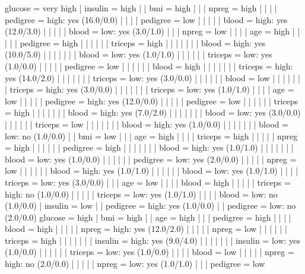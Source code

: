 glucose = very high
|   insulin = high
|   |   bmi = high
|   |   |   npreg = high
|   |   |   |   pedigree = high: yes (16.0/0.0)
|   |   |   |   pedigree = low
|   |   |   |   |   blood = high: yes (12.0/3.0)
|   |   |   |   |   blood = low: yes (3.0/1.0)
|   |   |   npreg = low
|   |   |   |   age = high
|   |   |   |   |   pedigree = high
|   |   |   |   |   |   triceps = high
|   |   |   |   |   |   |   blood = high: yes (10.0/5.0)
|   |   |   |   |   |   |   blood = low: yes (1.0/1.0)
|   |   |   |   |   |   triceps = low: yes (1.0/0.0)
|   |   |   |   |   pedigree = low
|   |   |   |   |   |   blood = high
|   |   |   |   |   |   |   triceps = high: yes (14.0/2.0)
|   |   |   |   |   |   |   triceps = low: yes (3.0/0.0)
|   |   |   |   |   |   blood = low
|   |   |   |   |   |   |   triceps = high: yes (3.0/0.0)
|   |   |   |   |   |   |   triceps = low: yes (1.0/1.0)
|   |   |   |   age = low
|   |   |   |   |   pedigree = high: yes (12.0/0.0)
|   |   |   |   |   pedigree = low
|   |   |   |   |   |   triceps = high
|   |   |   |   |   |   |   blood = high: yes (7.0/2.0)
|   |   |   |   |   |   |   blood = low: yes (3.0/0.0)
|   |   |   |   |   |   triceps = low
|   |   |   |   |   |   |   blood = high: yes (1.0/0.0)
|   |   |   |   |   |   |   blood = low: no (1.0/0.0)
|   |   bmi = low
|   |   |   age = high
|   |   |   |   triceps = high
|   |   |   |   |   npreg = high
|   |   |   |   |   |   pedigree = high
|   |   |   |   |   |   |   blood = high: yes (1.0/1.0)
|   |   |   |   |   |   |   blood = low: yes (1.0/0.0)
|   |   |   |   |   |   pedigree = low: yes (2.0/0.0)
|   |   |   |   |   npreg = low
|   |   |   |   |   |   blood = high: yes (1.0/1.0)
|   |   |   |   |   |   blood = low: yes (1.0/1.0)
|   |   |   |   triceps = low: yes (3.0/0.0)
|   |   |   age = low
|   |   |   |   blood = high
|   |   |   |   |   triceps = high: no (1.0/0.0)
|   |   |   |   |   triceps = low: yes (1.0/1.0)
|   |   |   |   blood = low: no (1.0/0.0)
|   insulin = low
|   |   pedigree = high: yes (1.0/0.0)
|   |   pedigree = low: no (2.0/0.0)
glucose = high
|   bmi = high
|   |   age = high
|   |   |   pedigree = high
|   |   |   |   blood = high
|   |   |   |   |   npreg = high: yes (12.0/2.0)
|   |   |   |   |   npreg = low
|   |   |   |   |   |   triceps = high
|   |   |   |   |   |   |   insulin = high: yes (9.0/4.0)
|   |   |   |   |   |   |   insulin = low: yes (1.0/0.0)
|   |   |   |   |   |   triceps = low: yes (1.0/0.0)
|   |   |   |   blood = low
|   |   |   |   |   npreg = high: no (2.0/0.0)
|   |   |   |   |   npreg = low: yes (1.0/1.0)
|   |   |   pedigree = low
